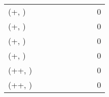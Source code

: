 \begin{tabular}{@{}lcccccccc@{}}
\lstmabbrev{} (+\languagemodelingabbrev{}, \validationshortabbrev{}) &  &  &  &  &  &  &  & 0 \\
\lstmabbrev{} (+\languagemodelingabbrev{}, \validationlongabbrev{}) &  &  &  &  &  &  &  & 0 \\
\lstmabbrev{} (+\nextsymbolsabbrev{}, \validationshortabbrev{}) &  &  &  &  &  &  &  & 0 \\
\lstmabbrev{} (+\nextsymbolsabbrev{}, \validationlongabbrev{}) &  &  &  &  &  &  &  & 0 \\
\lstmabbrev{} (+\languagemodelingabbrev{}+\nextsymbolsabbrev{}, \validationshortabbrev{}) &  &  &  &  &  &  &  & 0 \\
\lstmabbrev{} (+\languagemodelingabbrev{}+\nextsymbolsabbrev{}, \validationlongabbrev{}) &  &  &  &  &  &  &  & 0 \\
\bottomrule
\end{tabular}
